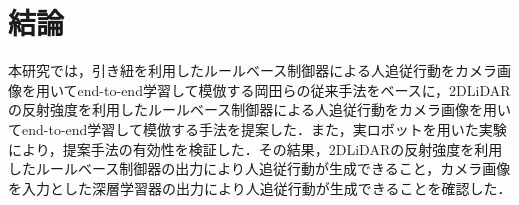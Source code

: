 \chapter{結論}
\label{end}

  本研究では，引き紐を利用したルールベース制御器による人追従行動をカメラ画像を用いてend-to-end学習して模倣する岡田らの従来手法をベースに，2DLiDARの反射強度を利用したルールベース制御器による人追従行動をカメラ画像を用いてend-to-end学習して模倣する手法を提案した．また，実ロボットを用いた実験により，提案手法の有効性を検証した．その結果，2DLiDARの反射強度を利用したルールベース制御器の出力により人追従行動が生成できること，カメラ画像を入力とした深層学習器の出力により人追従行動が生成できることを確認した．

%
% 
%
